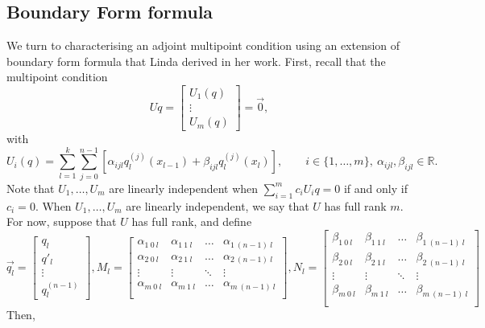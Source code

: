 \documentclass[10pt,reqno,oneside,a4paper]{article}
\begin{document}
\subsection{Boundary Form formula}
We turn to characterising an adjoint multipoint condition using an extension of boundary form formula that Linda derived in her work.
First, recall that the multipoint condition
\[ 
Uq = \begin{bmatrix} U_1(q) \\ \vdots \\U_m(q) \end{bmatrix} = \vec{0},
\]
with 
\[ 
U_i(q) = \sum^{k}_{l=1} \sum^{n-1}_{j=0}[\alpha_{ijl} q_l^{(j)}(x_{l-1}) + \beta_{ijl} q_l^{(j)}(x_{l})], \qquad i \in \{ 1, \ldots, m \}, ~ \alpha_{ijl}, \beta_{ijl} \in \mathbb{R}.
\]
Note that $U_1, \ldots, U_m$ are linearly independent when $\sum^m_{i=1} c_i U_i q = 0$ if and only if $c_i = 0.$ When $U_1, \ldots, U_m$ are linearly independent, we say that $U$ has full rank $m.$ For now, suppose that $U$ has full rank, and define 
\begin{equation*}
\vec{q_l} = 
\begin{bmatrix}
q_l \\
q'_l \\
\vdots \\
 q_l^{(n-1)} 
\end{bmatrix}, M_l = 
\begin{bmatrix}
\alpha_{1~0~l} & \alpha_{1~1~l} & \ldots & \alpha_{1~(n-1)~l} \\
\alpha_{2~0~l} & \alpha_{2~1~l} & \ldots & \alpha_{2~(n-1)~l} \\
\vdots & \vdots & \ddots & \vdots \\
\alpha_{m~0~l} & \alpha_{m~1~l} & \ldots & \alpha_{m~(n-1)~l} \\
\end{bmatrix}, 
N_l = 
\begin{bmatrix}
\beta_{1~0~l} & \beta_{1~1~l} & \ldots & \beta_{1~(n-1)~l} \\
\beta_{2~0~l} & \beta_{2~1~l} & \ldots & \beta_{2~(n-1)~l} \\
\vdots & \vdots & \ddots & \vdots \\
\beta_{m~0~l} & \beta_{m~1~l} & \ldots & \beta_{m~(n-1)~l} \\
\end{bmatrix}
\end{equation*}
Then, 
\end{document}
